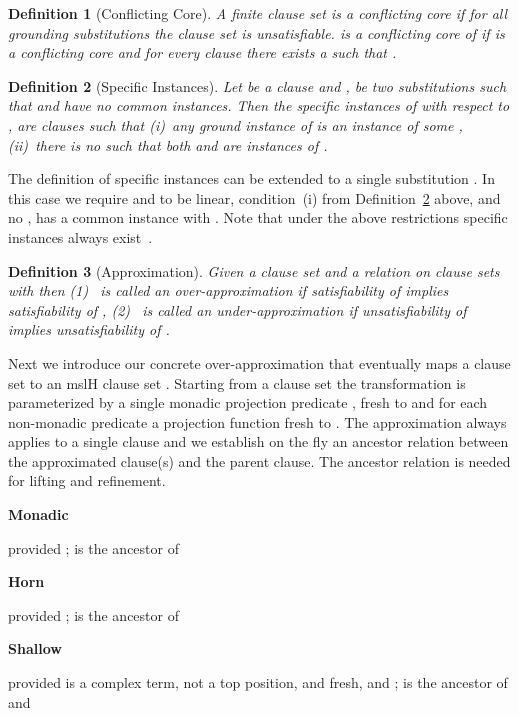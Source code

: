 \documentclass{llncs}
\newtheorem{defin}{Definition}
\newcommand{\shortrules}[6]{\noindent\begin{minipage}{#6ex}{\bfseries #1}\end{minipage}  #2  #3 \par\smallskip\noindent #4}
\begin{document}
\begin{defin}[Conflicting Core]\label{conlfictCore}
A finite clause set  is a conflicting core if for all grounding substitutions  the clause set  is unsatisfiable. 
 is a conflicting core of  if  is a conflicting core 
and for every clause  there exists a  such that .
\end{defin}

\begin{defin}[Specific Instances]\label{specInst}
Let  be a clause and ,  be two substitutions
such that  and  have no common instances.
Then the \emph{specific instances} of  with
respect to ,  are clauses  such that
(i)~any ground instance of  is an instance of some ,
(ii)~there is no  such that both  and  are 
instances of .
\end{defin}

The definition of specific instances can be extended to a single substitution .
In this case we require  and  to be linear,
condition~(i) from Definition~\ref{specInst} above,  and no , 
 has a common instance with .
Note that under the above restrictions specific instances always exist~\cite{Lassez:1987:ERT:33031.33036}.

\begin{defin}[Approximation]
Given a clause set  and a relation  on clause sets with  then
(1)~ is called an \emph{over-approximation}  if satisfiability of  implies satisfiability of ,
(2)~ is called an \emph{under-approximation} if unsatisfiability of  implies unsatisfiability of .
\end{defin}


Next we introduce our concrete over-approximation  that 
eventually maps a clause set  to an mslH
clause set . Starting from a clause set  the transformation is parameterized
by a single monadic projection predicate , fresh to 
and for each non-monadic predicate  a projection function  fresh to . The approximation
always applies to a single clause and we establish on the fly an ancestor relation between 
the approximated clause(s) and the parent clause. The ancestor relation is needed for lifting and refinement.

\bigskip
\shortrules{Monadic}{}{}{provided ;  is the ancestor of }{MO}{10}

\bigskip
\shortrules{Horn}{}{}{provided ;  is the ancestor of }{HO}{10}

\bigskip
\shortrules{Shallow}{}{}{provided  is a complex term,  not a top position,  and  fresh, 
and ;  is the ancestor of  and }{SH}{10}
\end{document}

